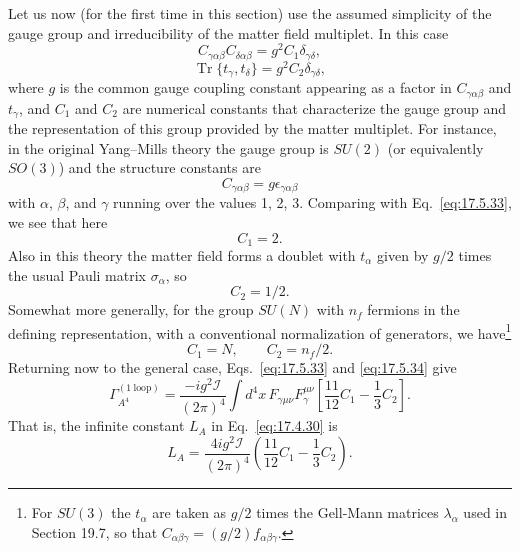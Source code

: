 Let us now (for the first time in this section) use the assumed simplicity
of the gauge group and irreducibility of the matter field multiplet. In this
case
\begin{equation}
C_{\gamma\alpha\beta}C_{\delta\alpha\beta}=g^2C_1\delta_{\gamma\delta},
\label{eq:17.5.33}
\end{equation}
\begin{equation}
\operatorname{Tr}\{t_\gamma,t_\delta\}=g^2C_2\delta_{\gamma\delta},
\label{eq:17.5.34}
\end{equation}
where $g$ is the common gauge coupling constant appearing as a factor in
$C_{\gamma\alpha\beta}$ and $t_\gamma$, and $C_1$ and $C_2$ are numerical
constants that characterize the gauge group and the representation of this
group provided by the matter multiplet. For instance, in the original
Yang--Mills theory the gauge group is $SU(2)$ (or equivalently $SO(3)$) and
the structure constants are
\[
C_{\gamma\alpha\beta}=g\epsilon_{\gamma\alpha\beta}
\]
with $\alpha$, $\beta$, and $\gamma$ running over the values 1, 2, 3.
Comparing with Eq.~\eqref{eq:17.5.33}, we see that here
\[
C_1=2.
\]
Also in this theory the matter field forms a doublet with $t_\alpha$ given by
$g/2$ times the usual Pauli matrix $\sigma_\alpha$, so
\[
C_2=1/2.
\]
Somewhat more generally, for the group $SU(N)$ with $n_f$ fermions in the
defining representation, with a conventional normalization of generators,
we have\footnote{For $SU(3)$ the $t_\alpha$ are taken as $g/2$ times the
Gell-Mann matrices $\lambda_\alpha$ used in Section 19.7, so that
$C_{\alpha\beta\gamma}=(g/2)f_{\alpha\beta\gamma}$.}
\begin{equation}
C_1=N,\qquad C_2=n_f/2.
\label{eq:17.5.35}
\end{equation}
Returning now to the general case, Eqs.~\eqref{eq:17.5.33} and
\eqref{eq:17.5.34} give
\begin{equation}
\Gamma_{A^4}^{(1\ \mathrm{loop})}
=\frac{-ig^2\mathcal I}{(2\pi)^4}\int d^4x\,F_{\gamma\mu\nu}F_\gamma^{\mu\nu}
\left[\frac{11}{12}C_1-\frac13C_2\right].
\label{eq:17.5.36}
\end{equation}
That is, the infinite constant $L_A$ in Eq.~\eqref{eq:17.4.30} is
\begin{equation}
L_A=\frac{4ig^2\mathcal I}{(2\pi)^4}
\left(\frac{11}{12}C_1-\frac13C_2\right).
\label{eq:17.5.37}
\end{equation}

